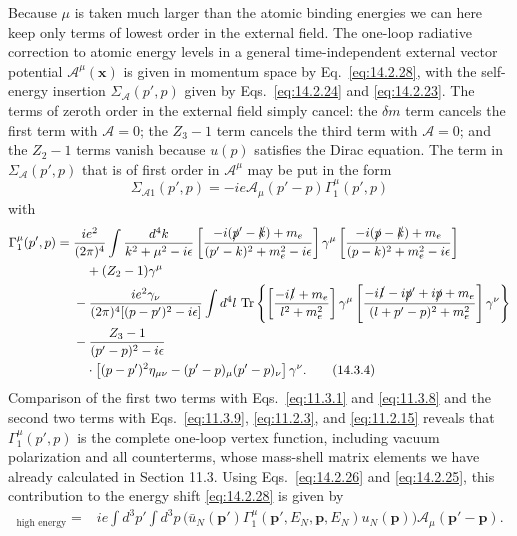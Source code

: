 Because $\mu$ is taken much larger than the atomic binding energies we can
here keep only terms of lowest order in the external field. The one-loop
radiative correction to atomic energy levels in a general time-independent
external vector potential $\mathcal A^\mu(\mathbf x)$ is given in momentum
space by Eq.~\eqref{eq:14.2.28}, with the self-energy insertion
$\Sigma_{\mathcal A}(p',p)$ given by Eqs.~\eqref{eq:14.2.24} and
\eqref{eq:14.2.23}. The terms of zeroth order in the external field simply
cancel: the $\delta m$ term cancels the first term with $\mathcal A=0$; the
$Z_3-1$ term cancels the third term with $\mathcal A=0$; and the $Z_2-1$ terms
vanish because $u(p)$ satisfies the Dirac equation. The term in
$\Sigma_{\mathcal A}(p',p)$ that is of first order in $\mathcal A^\mu$ may be
put in the form
\begin{equation}
\Sigma_{\mathcal A1}(p',p)=-ie\mathcal A_\mu(p'-p)\Gamma_1^\mu(p',p)
\tag{14.3.3}\label{eq:14.3.3}
\end{equation}
with
\begin{align}
\Gamma_1^\mu(p',p)={}&\frac{ie^2}{(2\pi)^4}\int
\frac{d^4k}{k^2+\mu^2-i\epsilon}
\left[\frac{-i(\sl{p}'-\sl{k})+m_e}
{(p'-k)^2+m_e^2-i\epsilon}\right]\gamma^\mu
\left[\frac{-i(\sl{p}-\sl{k})+m_e}
{(p-k)^2+m_e^2-i\epsilon}\right]
\notag\\
&\quad+(Z_2-1)\gamma^\mu \notag\\
&-\frac{ie^2\gamma_\nu}{(2\pi)^4[(p-p')^2-i\epsilon]}
\int d^4l\,\operatorname{Tr}\left\{
\left[\frac{-i\sl{l}+m_e}{l^2+m_e^2}\right]\gamma^\mu
\left[\frac{-i\sl{l}-i\sl{p}'+i\sl{p}+m_e}
{(l+p'-p)^2+m_e^2}\right]\gamma^\nu\right\}
\notag\\
&-\frac{Z_3-1}{(p'-p)^2-i\epsilon}\notag\\
&\quad\cdot
\left[(p-p')^2\eta_{\mu\nu}-(p'-p)_\mu(p'-p)_\nu\right]\gamma^\nu.
\tag{14.3.4}\label{eq:14.3.4}
\end{align}
Comparison of the first two terms with Eqs.~\eqref{eq:11.3.1} and
\eqref{eq:11.3.8} and the second two terms with Eqs.~\eqref{eq:11.3.9},
\eqref{eq:11.2.3}, and \eqref{eq:11.2.15} reveals that
$\Gamma_1^\mu(p',p)$ is the complete one-loop vertex function, including
vacuum polarization and all counterterms, whose mass-shell matrix elements we
have already calculated in Section 11.3. Using Eqs.~\eqref{eq:14.2.26} and
\eqref{eq:14.2.25}, this contribution to the energy shift
\eqref{eq:14.2.28} is given by
\begin{align}
[\delta E_N]_{\text{high energy}}
={}&ie\int d^3p'\int d^3p\,
\bigl(\bar u_N(\mathbf p')\Gamma_1^\mu(\mathbf p',E_N,
\mathbf p,E_N)u_N(\mathbf p)\bigr)
\mathcal A_\mu(\mathbf p'-\mathbf p).
\tag{14.3.5}\label{eq:14.3.5}
\end{align}
